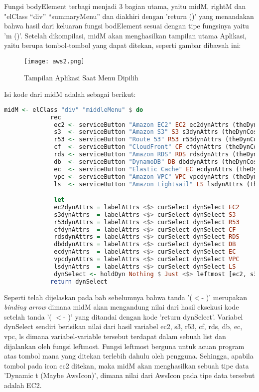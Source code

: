\documentclass[pi.tex]{subfile}
\begin{document}
    Fungsi bodyElement terbagi menjadi 3 bagian utama, yaitu midM, rightM dan "elClass ``div'' ``summaryMenu'' dan diakhiri dengan 'return ()' yang menandakan bahwa hasil dari keluaran fungsi bodElement sesuai dengan tipe fungsinya yaitu 'm ()'. Setelah dikompilasi, midM akan menghasilkan tampilan utama Aplikasi, yaitu berupa tombol-tombol yang dapat ditekan, seperti gambar dibawah ini:
  \begin{figure}[H]
    \centering
  \texttt{[image: aws2.png]}
  \caption[Tampilan Menu Dipilih]{Tampilan Aplikasi Saat Menu Dipilih}
  \end{figure}

  Isi kode dari midM adalah sebagai berikut:
     \begin{lstlisting}[language=Haskell]
       midM <- elClass "div" "middleMenu" $ do
             rec
              ec2 <- serviceButton "Amazon EC2" EC2 ec2dynAttrs (theDynCost rightM 1)
              s3  <- serviceButton "Amazon S3" S3 s3dynAttrs (theDynCost rightM 2)
              r53 <- serviceButton "Route 53" R53 r53dynAttrs (theDynCost rightM 3)
              cf  <- serviceButton "CloudFront" CF cfdynAttrs (theDynCost rightM 4)
              rds <- serviceButton "Amazon RDS" RDS rdsdynAttrs (theDynCost rightM 5)
              db  <- serviceButton "DynamoDB" DB dbddynAttrs (theDynCost rightM 6)
              ec  <- serviceButton "Elastic Cache" EC ecdynAttrs (theDynCost rightM 7)
              vpc <- serviceButton "Amazon VPC" VPC vpcdynAttrs (theDynCost rightM 9)
              ls  <- serviceButton "Amazon Lightsail" LS lsdynAttrs (theDynCost rightM 10)

              let 
	          ec2dynAttrs = labelAttrs <$> curSelect dynSelect EC2
	          s3dynAttrs  = labelAttrs <$> curSelect dynSelect S3
	          r53dynAttrs = labelAttrs <$> curSelect dynSelect R53
	          cfdynAttrs  = labelAttrs <$> curSelect dynSelect CF
	          rdsdynAttrs = labelAttrs <$> curSelect dynSelect RDS
	          dbddynAttrs = labelAttrs <$> curSelect dynSelect DB
	          ecdynAttrs  = labelAttrs <$> curSelect dynSelect EC
	          vpcdynAttrs = labelAttrs <$> curSelect dynSelect VPC
	          lsdynAttrs  = labelAttrs <$> curSelect dynSelect LS
              dynSelect <- holdDyn Nothing $ Just <$> leftmost [ec2, s3, r53, cf, rds, db, ec, vpc, ls]
             return dynSelect
     \end{lstlisting}
  Seperti telah dijelaskan pada bab sebelumnya bahwa tanda '($<$- )' merupakan \emph{binding arrow} dimana midM akan mengandung nilai dari hasil eksekusi kode setelah tanda '( $<$- )' yang ditandai dengan kode 'return dynSelect'. Variabel dynSelect sendiri berisikan nilai dari hasil variabel ec2, s3, r53, cf, rds, db, ec, vpc, ls dimana variabel-variable tersebut terdapat dalam sebuah list dan dijalankan oleh fungsi leftmost. Fungsi leftmost berguna untuk acuan program atas tombol mana yang ditekan terlebih dahulu oleh pengguna. Sehingga, apabila tombol pada icon ec2 ditekan, maka midM akan menghasilkan sebuah tipe data 'Dynamic t (Maybe AwsIcon)', dimana nilai dari AwsIcon pada tipe data tersebut adalah EC2.
     
\end{document}
